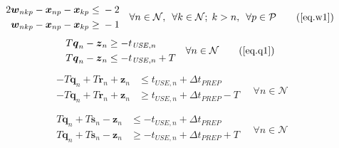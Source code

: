 \begin{equation}
    \begin{split}
        \begin{alignedat}{11}
            2&\boldsymbol{w}_{nkp} {}-{} &&\boldsymbol{x}_{np}
            {}-{} && \boldsymbol{x}_{kp} {}&&\le{} &{}-{} 2\\
            &\boldsymbol{w}_{nkp} {}-{} &&\boldsymbol{x}_{np}
            {}-{} && \boldsymbol{x}_{kp} {}&&\ge{} &{}-{} 1\\
        \end{alignedat}
    \end{split}
    \quad
    \begin{split}
        \forall n \in \mathcal{N}, \enspace \forall k \in \mathcal{N}; \; 
        k > n, \enspace \forall p \in \mathcal{P}
    \end{split}
    \tag{\ref{eq.w1}}
\end{equation}
\begin{equation}
    \begin{split}
        \begin{alignedat}{2}
            T \boldsymbol{q}_{n} - \boldsymbol{z}_{n} &\ge
            - t_{\mathit{USE},n}\\
            T \boldsymbol{q}_{n} - \boldsymbol{z}_{n} &\le
            - t_{\mathit{USE},n} + T\\
        \end{alignedat}
    \end{split}
    \quad \forall n \in \mathcal{N}
    \tag{\ref{eq.q1}}
\end{equation}
\begin{equation}
    \begin{split}
        \begin{alignedat}{2}
            -T \boldsymbol{q}_{n} + T \boldsymbol{r}_{n} + \boldsymbol{z}_{n}
            &\le t_{\mathit{USE},n} + \Delta t_{\mathit{PREP}}\\
            -T \boldsymbol{q}_{n} + T \boldsymbol{r}_{n} + \boldsymbol{z}_{n}
            &\ge t_{\mathit{USE},n} + \Delta t_{\mathit{PREP}} - T\\
            \end{alignedat}
        \quad \forall n \in \mathcal{N}
    \end{split}
    \label{eq.r2}
\end{equation}
\begin{equation}
    \begin{split}
        \begin{alignedat}{2}
            T \boldsymbol{q}_{n} + T \boldsymbol{s}_{n} - \boldsymbol{z}_{n}
            &\le -t_{\mathit{USE},n} + \Delta t_{\mathit{PREP}}\\
            T \boldsymbol{q}_{n} + T \boldsymbol{s}_{n} - \boldsymbol{z}_{n}
            &\ge -t_{\mathit{USE},n} + \Delta t_{\mathit{PREP}} + T\\
            \end{alignedat}
        \quad \forall n \in \mathcal{N}
    \end{split}
    \label{eq.s2}
\end{equation}
